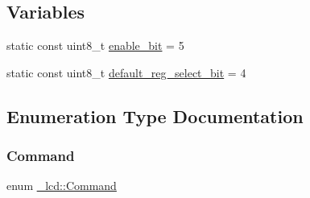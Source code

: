 \subsection*{Variables}
\begin{DoxyCompactItemize}
\item 
static const uint8\+\_\+t \hyperlink{namespace__lcd_a7b5c01ba44bccac5ddabf03bb93f96a2}{enable\+\_\+bit} = 5
\item 
static const uint8\+\_\+t \hyperlink{namespace__lcd_a190af2ac38800a5d174d5ff7194542bf}{default\+\_\+reg\+\_\+select\+\_\+bit} = 4
\end{DoxyCompactItemize}


\subsection{Enumeration Type Documentation}
\hypertarget{namespace__lcd_a1e6379f737c7a8316c1f747bbe272a5c}{}\label{namespace__lcd_a1e6379f737c7a8316c1f747bbe272a5c} 
\subsubsection{\texorpdfstring{Command}{Command}}
{\footnotesize\ttfamily enum \hyperlink{namespace__lcd_a1e6379f737c7a8316c1f747bbe272a5c}{\+\_\+lcd\+::\+Command}}

